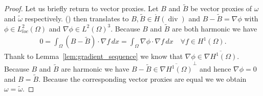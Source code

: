 \documentclass[12pt,a4paper]{article}
\numberwithin{equation}{subsection}
\numberwithin{lemma}{subsection}
\theoremstyle{definition}
\DeclareMathOperator{\diver}{div}
\newcommand{\rop}{\mathscr{R}} %
\begin{document}
\begin{proof}
    Let us briefly return to vector proxies. Let $B$ and $\tilde{B}$ be 
    vector proxies of $\omega$ and $\tilde{\omega}$ respectively. 
    () then translates to 
    $B, \tilde{B} \in \mathring{H}(\diver)$ %
    and $B-\tilde{B} = \nabla \phi$ with $\phi \in L^2_{loc}(\Omega)$ and
    $\nabla \phi \in L^2(\Omega)^3$.
    Because $B$ and $\tilde{B}$ are both harmonic we have 
    \begin{align*}
        0 = \int_\Omega (B-\tilde{B}) \cdot \nabla f\, dx 
        = \int_\Omega \nabla \phi \cdot \nabla f \,dx
        \quad \forall 
        f \in H^1(\Omega).
    \end{align*}
    Thank to Lemma~\ref{lem:gradient_sequence} we know that 
    $\nabla \phi \in \overline{\nabla H^1(\Omega)}$. 
    Because $B$ and $\tilde{B}$ are harmonic we have 
    $B - \tilde{B} \in 
    \overline{\nabla H^1(\Omega)}^\perp$ and hence $\nabla \phi = 0$
    and $B = \tilde{B}$. Because the corresponding vector proxies are equal we 
    we obtain $\omega = \tilde{\omega}$.
\end{proof}



    
\end{document}

